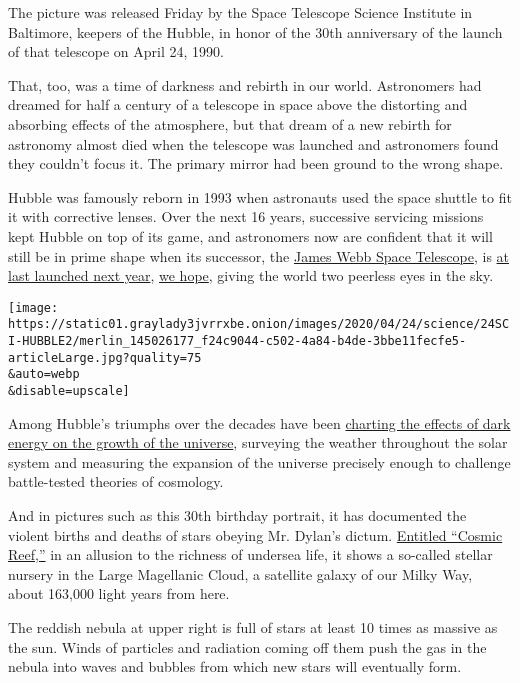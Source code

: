 The picture was released Friday by the Space Telescope Science Institute
in Baltimore, keepers of the Hubble, in honor of the 30th anniversary of
the launch of that telescope on April 24, 1990.

That, too, was a time of darkness and rebirth in our world. Astronomers
had dreamed for half a century of a telescope in space above the
distorting and absorbing effects of the atmosphere, but that dream of a
new rebirth for astronomy almost died when the telescope was launched
and astronomers found they couldn't focus it. The primary mirror had
been ground to the wrong shape.

Hubble was famously reborn in 1993 when astronauts used the space
shuttle to fit it with corrective lenses. Over the next 16 years,
successive servicing missions kept Hubble on top of its game, and
astronomers now are confident that it will still be in prime shape when
its successor, the
\href{https://www.nytimes3xbfgragh.onion/2016/11/22/science/nasa-webb-space-telescope-hubble.html}{James
Webb Space Telescope}, is
\href{https://www.nytimes3xbfgragh.onion/2018/06/27/science/webb-telescope-nasa.html}{at
last launched next year},
\href{https://www.nytimes3xbfgragh.onion/2020/03/19/science/nasa-coronavirus-sls-rocket-moon.html}{we
hope}, giving the world two peerless eyes in the sky.

\texttt{[image: https://static01.graylady3jvrrxbe.onion/images/2020/04/24/science/24SCI-HUBBLE2/merlin\_145026177\_f24c9044-c502-4a84-b4de-3bbe11fecfe5-articleLarge.jpg?quality=75\\\&auto=webp\\\&disable=upscale]}

Among Hubble's triumphs over the decades have been
\href{https://www.nytimes3xbfgragh.onion/2019/02/25/science/cosmos-hubble-dark-energy.html}{charting
the effects of dark energy on the growth of the universe}, surveying the
weather throughout the solar system and measuring the expansion of the
universe precisely enough to challenge battle-tested theories of
cosmology.

And in pictures such as this 30th birthday portrait, it has documented
the violent births and deaths of stars obeying Mr. Dylan's dictum.
\href{https://hubblesite.org/contents/news-releases/2020/news-2020-16\#section-id-2}{Entitled
``Cosmic Reef,''} in an allusion to the richness of undersea life, it
shows a so-called stellar nursery in the Large Magellanic Cloud, a
satellite galaxy of our Milky Way, about 163,000 light years from here.

The reddish nebula at upper right is full of stars at least 10 times as
massive as the sun. Winds of particles and radiation coming off them
push the gas in the nebula into waves and bubbles from which new stars
will eventually form.

